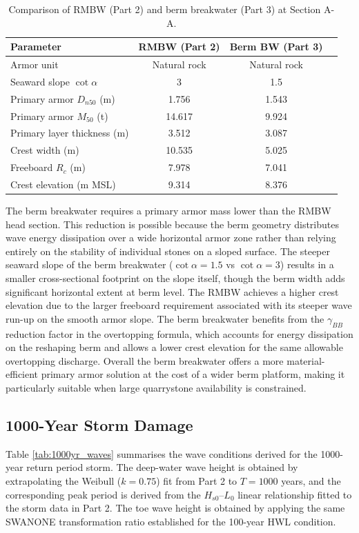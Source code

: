 \documentclass[a4paper, 11pt]{article}
\begin{document}
\begin{table}[h!]
\centering
\caption{Comparison of RMBW (Part 2) and berm breakwater (Part 3) at Section A-A.}
\label{tab:comparison}
\begin{tabular}{lccc}
\hline
Parameter & RMBW (Part 2) & Berm BW (Part 3) \\
\hline
Armor unit & Natural rock & Natural rock \\
Seaward slope $\cot\alpha$ & 3 & 1.5 \\
Primary armor $D_{n50}$ (m) & 1.756 & 1.543 \\
Primary armor $M_{50}$ (t) & 14.617 & 9.924 \\
Primary layer thickness (m) & 3.512 & 3.087 \\
Crest width (m) & 10.535 & 5.025 \\
Freeboard $R_c$ (m) & 7.978 & 7.041 \\
Crest elevation (m MSL) & 9.314 & 8.376 \\
\hline
\end{tabular}
\end{table}

The berm breakwater requires a primary armor mass lower than the RMBW head section. This reduction is possible because the berm geometry distributes wave energy dissipation over a wide horizontal armor zone rather than relying entirely on the stability of individual stones on a sloped surface. The steeper seaward slope of the berm breakwater ($\cot\alpha = 1.5$ vs $\cot\alpha = 3$) results in a smaller cross-sectional footprint on the slope itself, though the berm width adds significant horizontal extent at berm level. The RMBW achieves a higher crest elevation due to the larger freeboard requirement associated with its steeper wave run-up on the smooth armor slope. The berm breakwater benefits from the $\gamma_{BB}$ reduction factor in the overtopping formula, which accounts for energy dissipation on the reshaping berm and allows a lower crest elevation for the same allowable overtopping discharge. Overall the berm breakwater offers a more material-efficient primary armor solution at the cost of a wider berm platform, making it particularly suitable when large quarrystone availability is constrained.

\subsection{1000-Year Storm Damage}
\hspace{0.5cm}Table \ref{tab:1000yr_waves} summarises the wave conditions derived for the 1000-year return period storm. The deep-water wave height is obtained by extrapolating the Weibull ($k = 0.75$) fit from Part 2 to $T = 1000$ years, and the corresponding peak period is derived from the $H_{s0}$--$L_0$ linear relationship fitted to the storm data in Part 2. The toe wave height is obtained by applying the same SWANONE transformation ratio established for the 100-year HWL condition.
\end{document}
